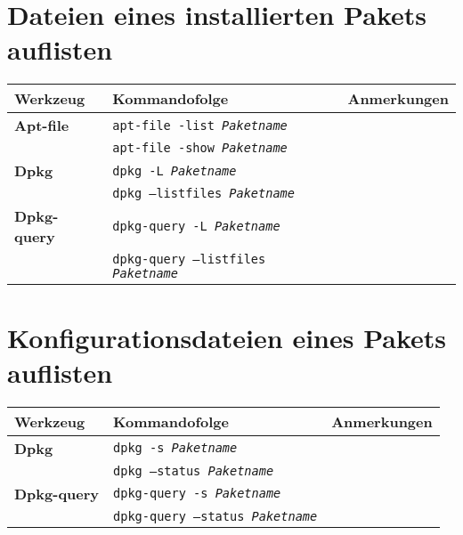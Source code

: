 \documentclass[10pt,a4paper]{article}
\begin{document}
\section{Dateien eines installierten Pakets auflisten}
\begin{tabular}{ p{3.5cm} p{9.6cm} p{11cm}}
  \hline
  \rowcolor{Gray}
  \textbf{Werkzeug} & \textbf{Kommandofolge} & \textbf{Anmerkungen} \\
  \hline 
  \textbf{Apt-file} & \texttt{apt-file -list \textit{Paketname}} & \\
  \rowcolor{Gray}
  & \texttt{apt-file -show \textit{Paketname}} & \\
  \textbf{Dpkg} & \texttt{dpkg -L \textit{Paketname}} & \\
  \rowcolor{Gray}
  & \texttt{dpkg --listfiles \textit{Paketname}} & \\
  \textbf{Dpkg-query} & \texttt{dpkg-query -L \textit{Paketname}} & \\
  \rowcolor{Gray}
  & \texttt{dpkg-query --listfiles \textit{Paketname}} & \\
  \hline
\end{tabular}

\newpage

\cheatsheet
\section{Konfigurationsdateien eines Pakets auflisten}
\begin{tabular}{ p{3.5cm} p{9.6cm} p{11cm}}
  \hline
  \rowcolor{Gray}
  \textbf{Werkzeug} & \textbf{Kommandofolge} & \textbf{Anmerkungen} \\
  \hline 
  \textbf{Dpkg} & \texttt{dpkg -s \textit{Paketname}} & \\
  \rowcolor{Gray}
  & \texttt{dpkg --status \textit{Paketname}} & \\
  \textbf{Dpkg-query} & \texttt{dpkg-query -s \textit{Paketname}} & \\
  \rowcolor{Gray}
  & \texttt{dpkg-query --status \textit{Paketname}} & \\
  \hline
\end{tabular}
\end{document}
